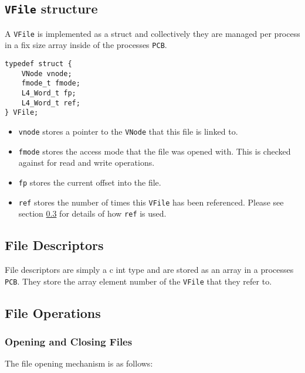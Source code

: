 \documentclass[12pt,english]{article}
\begin{document}
\subsection{\texttt{VFile} structure} \label{vfs:vfile_struct}

A \texttt{VFile} is implemented as a struct and collectively they are managed per process in a fix size array inside of the processes \texttt{PCB}.

\begin{verbatim}
typedef struct {
    VNode vnode;
    fmode_t fmode;
    L4_Word_t fp;
    L4_Word_t ref;
} VFile;
\end{verbatim}

\begin{itemize}
\item \texttt{vnode} stores a pointer to the \texttt{VNode} that this file is linked to.
\item \texttt{fmode} stores the access mode that the file was opened with. This is checked against for read and write operations.
\item \texttt{fp} stores the current offset into the file.
\item \texttt{ref} stores the number of times this \texttt{VFile} has been referenced. Please see section \ref{vfs:file_ops} for details of how \texttt{ref} is used.
\end{itemize}

\subsection{File Descriptors} \label{vfs:fds}

File descriptors are simply a c int type and are stored as an array in a processes \texttt{PCB}. They store the array element number of the \texttt{VFile} that they refer to.

\subsection{File Operations} \label{vfs:file_ops}

\subsubsection{Opening and Closing Files} \label{vfs:file_ops:openclose}

The file opening mechanism is as follows:
\end{document}
